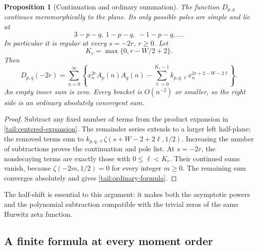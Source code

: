 \documentclass[11pt,a4paper]{article}
\numberwithin{equation}{section}
\newtheorem{proposition}[theorem]{Proposition}
\theoremstyle{definition}
\theoremstyle{remark}
\begin{document}
\begin{proposition}[Continuation and ordinary summation]
\label{tail:ordinary}
The function \(D_{p,q}\) continues meromorphically to the plane. Its
only possible poles are simple and lie at
\[
 3-p-q,\ 1-p-q,\ -1-p-q,\ldots.
\]
In particular it is regular at every \(s=-2r\), \(r\ge0\).
Let
\[
 K_r=\max\{0,r-W/2+2\}.
\]
Then
\begin{equation}\label{tail:ordinary-formula}
 D_{p,q}(-2r)=\sum_{n=0}^{\infty}
 \left\{x_n^{2r}A_p(n)A_q(n)
       -\sum_{\ell=0}^{K_r-1}
         k_{p,q,\ell}x_n^{2r+2-W-2\ell}\right\}.
\end{equation}
An empty inner sum is zero. Every bracket is \(O(n^{-2})\) or
smaller, so the right side is an ordinary absolutely convergent sum.
\end{proposition}

\begin{proof}
Subtract any fixed number of terms from the product expansion in
\eqref{tail:centered-expansion}. The remainder series extends to a
larger left half-plane; the removed terms sum to
\(k_{p,q,\ell}\zeta(s+W-2+2\ell,1/2)\). Increasing the number of
subtractions proves the continuation and pole list. At \(s=-2r\),
the nondecaying terms are exactly those with \(0\le\ell<K_r\).
Their continued sums vanish, because
\(\zeta(-2m,1/2)=0\) for every integer \(m\ge0\). The remaining
sum converges absolutely and gives \eqref{tail:ordinary-formula}.
\end{proof}

The half-shift is essential to this argument: it makes both the
asymptotic powers and the polynomial subtraction compatible with the
trivial zeros of the same Hurwitz zeta function.

\subsection{A finite formula at every moment order}
\end{document}
